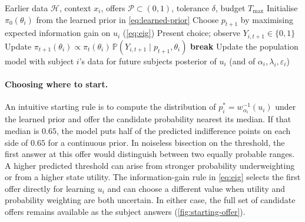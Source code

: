 \documentclass[11pt,a4paper]{article}
\newcommand{\Prob}{\mathbb{P}}
\begin{document}
\begin{algorithm}[t]
\caption{Hierarchical adaptive Standard Gamble (HA-SG)}
\label{alg:hasg}
\begin{algorithmic}[1]
\Require Earlier data $\mathcal H$, context $x_i$, offers $\mathcal{P}\subset(0,1)$, tolerance $\delta$, budget $T_{\max}$
\State Initialise $\pi_0(\theta_i)$ from the learned prior in \cref{eq:learned-prior}
  \State Choose $p_{t+1}$ by maximising expected information gain on $u_i$ (\cref{eq:eig})
  \State Present choice; observe $Y_{i,t+1}\in\{0,1\}$
  \State Update $\pi_{t+1}(\theta_i) \propto \pi_t(\theta_i)\,\Prob(Y_{i,t+1}\mid p_{t+1},\theta_i)$
    \State \textbf{break}
  \EndIf
\EndFor
\State Update the population model with subject $i$'s data for future subjects
\State \Return posterior of $u_i$ (and of $\alpha_i,\lambda_i,\varepsilon_i$)
\end{algorithmic}
\end{algorithm}

\paragraph{Choosing where to start.}
An intuitive starting rule is to compute the distribution of $p_i^\ast=w_{\alpha_i}^{-1}(u_i)$ under the learned prior and offer the candidate probability nearest its median. If that median is $0.65$, the model puts half of the predicted indifference points on each side of $0.65$ for a continuous prior. In noiseless bisection on the threshold, the first answer at this offer would distinguish between two equally probable ranges. A higher predicted threshold can arise from stronger probability underweighting or from a higher state utility. The information-gain rule in \cref{eq:eig} selects the first offer directly for learning $u_i$ and can choose a different value when utility and probability weighting are both uncertain. In either case, the full set of candidate offers remains available as the subject answers (\cref{fig:starting-offer}).
\end{document}
